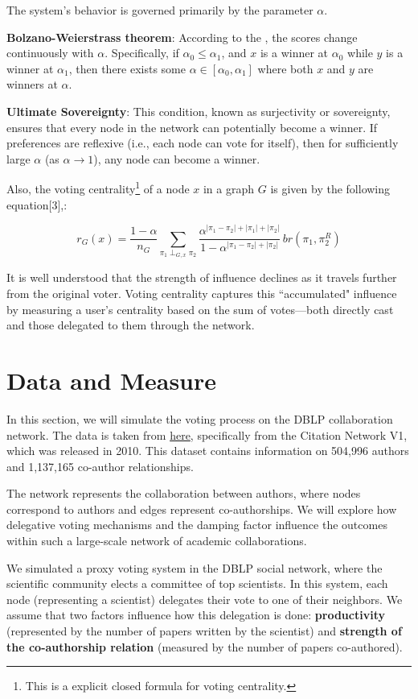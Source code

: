 \documentclass{article} %
\begin{document}
The system's behavior is governed primarily by the parameter \( \alpha \). 

\textbf{Bolzano-Weierstrass theorem}: According to the , the scores change continuously with \( \alpha \). Specifically, if \( \alpha_0 \leq \alpha_1 \), and \( x \) is a winner at \( \alpha_0 \) while \( y \) is a winner at \( \alpha_1 \), then there exists some \( \alpha \in [\alpha_0, \alpha_1] \) where both \( x \) and \( y \) are winners at \( \alpha \).

\textbf{Ultimate Sovereignty}: This condition, known as surjectivity or sovereignty, ensures that every node in the network can potentially become a winner. If preferences are reflexive (i.e., each node can vote for itself), then for sufficiently large \( \alpha \) (as \( \alpha \to 1 \)), any node can become a winner.

Also, the voting centrality\footnote{This is a explicit closed formula
for voting centrality.} of a node \( x \) in a graph \( G \) is given by the following equation[3],:

\[
r_G(x) = \frac{1 - \alpha}{n_G} \sum_{\pi_1 \perp_{G,x} \pi_2} \frac{\alpha^{|\pi_1 - \pi_2| + |\pi_1| + |\pi_2|}}{1 - \alpha^{|\pi_1 - \pi_2| + |\pi_2|}} \, br(\pi_1, \pi_2^R)
\]

It is well understood that the strength of influence declines as it travels further from the original voter. Voting centrality captures this ``accumulated" influence by measuring a user's centrality based on the sum of votes—both directly cast and those delegated to them through the network.


\section{Data and Measure}
In this section, we will simulate the voting process on the DBLP collaboration network. The data is taken from \href{https://www.aminer.cn/citation}{here}, specifically from the Citation Network V1, which was released in 2010. This dataset contains information on 504,996 authors and 1,137,165 co-author relationships.

The network represents the collaboration between authors, where nodes correspond to authors and edges represent co-authorships. We will explore how delegative voting mechanisms and the damping factor influence the outcomes within such a large-scale network of academic collaborations.

We simulated a proxy voting system in the DBLP social network, where the scientific community elects a committee of top scientists. In this system, each node (representing a scientist) delegates their vote to one of their neighbors. We assume that two factors influence how this delegation is done: \textbf{productivity} (represented by the number of papers written by the scientist) and \textbf{strength of the co-authorship relation} (measured by the number of papers co-authored).
\end{document}
